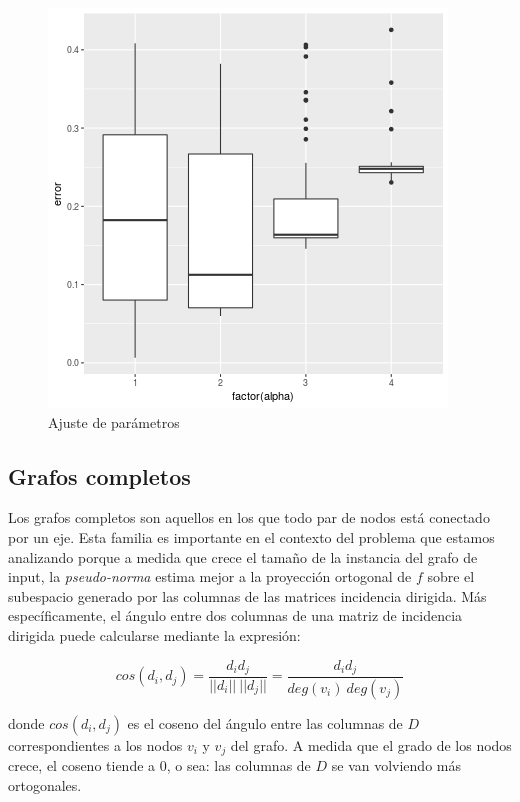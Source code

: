 \documentclass[10pt, a4paper, twocolumn]{article} %
\begin{document}
\begin{figure}
	\includegraphics[width=\linewidth]{calibrate_complete_beta10_iter20000_tests50.png} %
	\caption{Ajuste de parámetros} %
	\label{fig:ajuste2} %
\end{figure}

\newpage

\subsection{Grafos completos}

Los grafos completos son aquellos en los que todo par de nodos está 
conectado por un eje. Esta familia es importante en el contexto del 
problema que estamos analizando porque a medida que crece el tamaño de 
la instancia del grafo de input, la \emph{pseudo-norma} estima mejor a 
la proyección ortogonal de $f$ sobre el subespacio generado por las 
columnas de las matrices incidencia dirigida. Más específicamente, el 
ángulo entre dos columnas de una matriz de incidencia dirigida puede 
calcularse mediante la expresión:

$$cos(d_i,d_j) = \frac{d_i d_j}{||d_i|| \ ||d_j||} = 
\frac{d_i d_j}{deg(v_i) \ deg(v_j)}$$

donde $cos(d_i,d_j)$ es el coseno del ángulo entre las columnas de $D$ 
correspondientes a los nodos $v_i$ y $v_j$ del grafo. A medida que el 
grado de los nodos crece, el coseno tiende a $0$, o sea: las 
columnas de $D$ se van volviendo más ortogonales.
\end{document}
